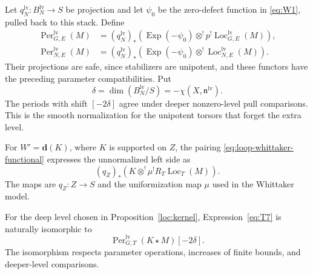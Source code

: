 Let $q_N^{\mathrm{lv}}:B_N^{\mathrm{lv}}\to S$ be projection and let
$\psi_0$ be the zero-defect function in \eqref{eq:W1}, pulled back to
this stack.  Define
\[
 \begin{split}
 \operatorname{Per}_{G,E}^{\mathrm{lv}}(M)
   &=(q_N^{\mathrm{lv}})_*
     \left(\operatorname{Exp}(-\psi_0)\otimes^!
                  p^!\operatorname{Loc}_{G,E}^{\mathrm{lv}}(M)\right),\\
 \operatorname{Per}_{N,E}^{\mathrm{lv}}(M)
   &=(q_N^{\mathrm{lv}})_*
     \left(\operatorname{Exp}(-\psi_0)\otimes^!
                    \operatorname{Loc}_{N,E}^{\mathrm{lv}}(M)\right).
 \end{split}
\]
Their projections are safe, since stabilizers are unipotent, and these
functors have the preceding parameter compatibilities.  Put
\[
 \delta=\dim(B_N^{\mathrm{lv}}/S)
             =-\chi(X,\mathfrak n^{\mathrm{lv}}).
\]
The periods with shift $[-2\delta]$ agree under deeper nonzero-level
pull comparisons.  This is the smooth normalization for the
unipotent torsors that forget the extra level.

For $W'=\mathbf d(K)$, where $K$ is supported on $Z$, the pairing
\eqref{eq:loop-whittaker-functional} expresses the unnormalized left side
as
\begin{equation}\label{eq:T7}
 (q_Z)_*\left(K\otimes^!\mu^!R_T
                              \operatorname{Loc}_T(M)\right).
\end{equation}
The maps are $q_Z:Z\to S$ and the uniformization map $\mu$ used in
the Whittaker model.

\begin{proposition}\label{loc:averaging}
For the deep level chosen in Proposition~\ref{loc:kernel},
Expression~\eqref{eq:T7} is naturally isomorphic to
\begin{equation}\label{eq:T8}
 \operatorname{Per}_{G,T}^{\mathrm{lv}}(K\star M)[-2\delta].
\end{equation}
The isomorphism respects parameter operations, increases of finite
bounds, and deeper-level comparisons.
\end{proposition}

